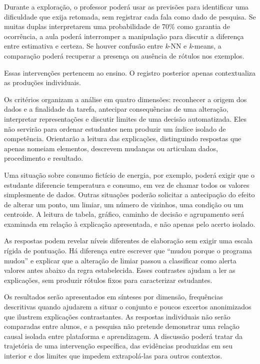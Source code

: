 Durante a exploração, o professor poderá usar as previsões para identificar uma dificuldade que exija retomada, sem registrar cada fala como dado de pesquisa. Se muitas duplas interpretarem uma probabilidade de 70\% como garantia de ocorrência, a aula poderá interromper a manipulação para discutir a diferença entre estimativa e certeza. Se houver confusão entre \textit{k}-NN e \textit{k}-means, a comparação poderá recuperar a presença ou ausência de rótulos nos exemplos.

Essas intervenções pertencem ao ensino. O registro posterior apenas contextualiza as produções individuais.

Os critérios organizam a análise em quatro dimensões: reconhecer a origem dos dados e a finalidade da tarefa, antecipar consequências de uma alteração, interpretar representações e discutir limites de uma decisão automatizada. Eles não servirão para ordenar estudantes nem produzir um índice isolado de competência. Orientarão a leitura das explicações, distinguindo respostas que apenas nomeiam elementos, descrevem mudanças ou articulam dados, procedimento e resultado.

Uma situação sobre consumo fictício de energia, por exemplo, poderá exigir que o estudante diferencie temperatura e consumo, em vez de chamar todos os valores simplesmente de dados. Outras situações poderão solicitar a antecipação do efeito de alterar um ponto, um limiar, um número de vizinhos, uma condição ou um centroide. A leitura de tabela, gráfico, caminho de decisão e agrupamento será examinada em relação à explicação apresentada, e não apenas pelo acerto isolado.

As respostas podem revelar níveis diferentes de elaboração sem exigir uma escala rígida de pontuação. Há diferença entre escrever que ``mudou porque o programa mudou'' e explicar que a alteração de limiar passou a classificar como alerta valores antes abaixo da regra estabelecida. Esses contrastes ajudam a ler as explicações, sem produzir rótulos fixos para caracterizar estudantes.

Os resultados serão apresentados em sínteses por dimensão, frequências descritivas quando ajudarem a situar o conjunto e poucos excertos anonimizados que ilustrem explicações contrastantes. As respostas individuais não serão comparadas entre alunos, e a pesquisa não pretende demonstrar uma relação causal isolada entre plataforma e aprendizagem. A discussão poderá tratar da trajetória de uma intervenção específica, das evidências produzidas em seu interior e dos limites que impedem extrapolá-las para outros contextos.

